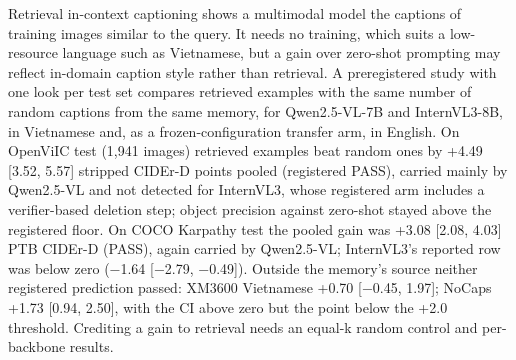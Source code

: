 Retrieval in-context captioning shows a multimodal model the captions of
training images similar to the query. It needs no training, which suits
a low-resource language such as Vietnamese, but a gain over zero-shot
prompting may reflect in-domain caption style rather than retrieval. A
preregistered study with one look per test set compares retrieved
examples with the same number of random captions from the same memory,
for Qwen2.5-VL-7B and InternVL3-8B, in Vietnamese and, as a
frozen-configuration transfer arm, in English. On OpenViIC test (1,941
images) retrieved examples beat random ones by +4.49 {[}3.52, 5.57{]}
stripped CIDEr-D points pooled (registered PASS), carried mainly by
Qwen2.5-VL and not detected for InternVL3, whose registered arm includes
a verifier-based deletion step; object precision against zero-shot
stayed above the registered floor. On COCO Karpathy test the pooled gain
was +3.08 {[}2.08, 4.03{]} PTB CIDEr-D (PASS), again carried by
Qwen2.5-VL; InternVL3's reported row was below zero (−1.64 {[}−2.79,
−0.49{]}). Outside the memory's source neither registered prediction
passed: XM3600 Vietnamese +0.70 {[}−0.45, 1.97{]}; NoCaps +1.73 {[}0.94,
2.50{]}, with the CI above zero but the point below the +2.0 threshold.
Crediting a gain to retrieval needs an equal-k random control and
per-backbone results.
